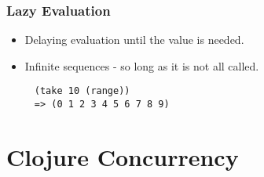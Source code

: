 \documentclass{beamer}
\begin{document}
\begin{frame}[fragile]
\frametitle{Lazy Evaluation}
	\begin{itemize}
	  \item Delaying evaluation until the value is needed.
  	  \item Infinite sequences - so long as it is not all called.
       \end{itemize}	
	\begin{verbatim}
	 (take 10 (range))
	 => (0 1 2 3 4 5 6 7 8 9)
	\end{verbatim}
\end{frame}

\section{Clojure Concurrency}
\end{document}
